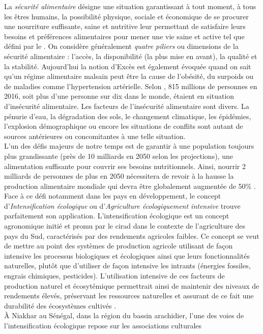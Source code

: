 La \emph{sécurité alimentaire} désigne \og une situation garantissant à tout moment, à tous les êtres humains, la possibilité physique, sociale et économique 
de se procurer une nourriture suffisante, saine et nutritive leur permettant de satisfaire leurs besoins et préférences alimentaires pour mener une vie saine et active \fg{} 
tel que défini par le \citet{ComitedelaSecuriteAlimentaireMondiale2012}. On considère généralement \emph {quatre piliers} ou dimensions de la sécurité alimentaire : l'accès, la disponibilité 
(la plus mise en avant), la qualité et la stabilité. Aujourd'hui la notion d'Excès est également évoquée quand on sait qu'un régime alimentaire malsain peut être la cause de 
l'obésité, du surpoids ou de maladies comme l'hypertension artérielle. Selon \citep{FAO2017}, 815 millions de personnes en 2016, soit plus d'une personne sur dix dans le monde, étaient en situation 
d'insécurité alimentaire. Les facteurs de l'insécurité alimentaire sont divers. La pénurie d'eau, la dégradation des sols, le changement climatique, les épidémies, 
l'explosion démographique ou encore les situations de conflits sont autant de sources antérieures ou concomitantes à une telle situation. \\L'un des défis majeurs de notre temps est de garantir à une 
population toujours plus grandissante (près de 10 milliards en 2050 selon les projections), une alimentation suffisante pour couvrir ses besoins nutritionnels. 
Ainsi, nourrir 2 milliards de personnes de plus en 2050 nécessitera de revoir à la hausse la production alimentaire mondiale qui devra être globalement augmentée de 50\% . Face à ce défi notamment dans les pays en développement, le concept \og d'\emph{Intensification écologique} ou d'\emph{Agriculture écologiquement intensive} \fg{} trouve 
parfaitement son application. L'intensification écologique est un concept agronomique initié et promu par le \acrshort{cirad} dans le contexte de l'agriculture des pays du Sud, caractérisés par des 
rendements agricoles faibles. Ce concept se veut de mettre au point des systèmes de production agricole utilisant de façon intensive les processus biologiques et écologiques ainsi que leurs 
fonctionnalités naturelles, plutôt que d'utiliser de façon intensive les intrants (énergies fossiles, engrais chimiques, pesticides). L'utilisation intensive de ces facteurs de 
production naturel et écosytémique permettrait ainsi de maintenir des niveaux de rendements élevés, préservant les ressources naturelles et assurant de ce fait une durabilité des
écosystèmes cultivés \citep{Goulet2012}.\\ \`A Niakhar au Sénégal, dans la région du bassin arachidier, l'une des voies de l'intensification écologique repose sur les associations culturales 
